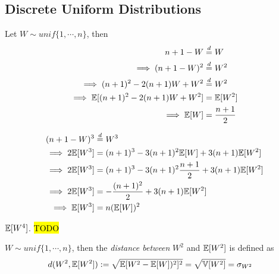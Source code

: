 \documentclass{article}
\begin{document}
	\subsection{Discrete Uniform Distributions}
	   	\begin{proposition}
   		Let $W \sim unif\{1, \cdots, n\}$, then
   		\begin{align}
   			n + 1 - W &\overset{d}{=} W \\
   			\implies (n + 1 - W)^2 &\overset{d}{=} W^2 \\
   			\implies (n+1)^2 - 2(n+1)W + W^2 &\overset{d}{=} W^2 \\
   			\implies \mathbb{E}[{(n+1)^2 - 2(n+1)W + W^2}] &= \mathbb{E}[{W^2}] \\
   			\implies \mathbb{E}[{W}] &= \frac{n+1}{2}
   		\end{align}
   	\end{proposition}
   	
   	\begin{proposition}
   		\begin{align}
   			(n+1-W)^3 &\overset{d}{=} W^3 \\
   			\implies 2 \mathbb{E}[{W^3}] &= (n+1)^3 - 3(n+1)^2 \mathbb{E}[{W}] + 3(n+1) \mathbb{E}[{W^2}] \\
   			\implies 2 \mathbb{E}[{W^3}] &= (n+1)^3 - 3(n+1)^2 \frac{n+1}{2} + 3(n+1) \mathbb{E}[{W^2}] \\
   			\implies 2 \mathbb{E}[{W^3}] &= - \frac{(n+1)^2}{2} + 3(n+1) \mathbb{E}[{W^2}] \\
   			\implies \mathbb{E}[{W^3}] &= n (\mathbb{E}[{W}])^2
   		\end{align}
   	\end{proposition}
   	
   	\begin{proposition}
   		$\mathbb{E}[{W^4}]$. \hl{TODO}
   	\end{proposition}
   	
   	\begin{definition}
   		$W \sim unif\{1, \cdots, n\}$, then the \emph{distance between} $W^2$ and $\mathbb{E}[{W^2}]$ is defined as
   		\begin{align}
   			d(W^2, \mathbb{E}[{W^2}]) &:= \sqrt{\mathbb{E}[{W^2 - \mathbb{E}[{W}])^2}]^2} = \sqrt{\mathbb{V}[{W^2}]} = \sigma_{W^2}
   		\end{align}
   	\end{definition}
   	
\end{document}
